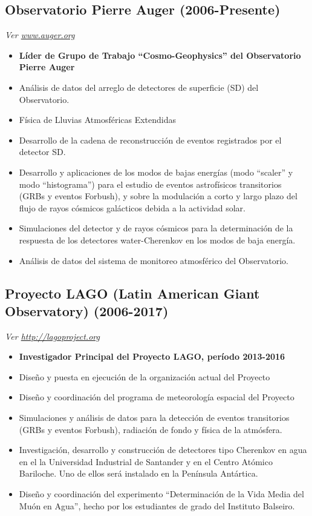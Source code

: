\subsection*{Observatorio Pierre Auger (2006-Presente)}

{\small{\textit{Ver \href{http://www.auger.org/}{www.auger.org}}}}
\begin{itemize}
\item {\bf{Líder de Grupo de Trabajo ``Cosmo-Geophysics'' del Observatorio Pierre Auger}}
\item Análisis de datos del arreglo de detectores de superficie (SD) del Observatorio.
\item Física de Lluvias Atmosféricas Extendidas
\item Desarrollo de la cadena de reconstrucción de eventos registrados por el detector SD.
\item Desarrollo y aplicaciones de los modos de bajas energías (modo ``scaler'' y modo ``histograma'') para el estudio de eventos astrofísicos transitorios (GRBs y eventos Forbush), y sobre la modulación a corto y largo plazo del flujo de rayos cósmicos galácticos debida a la actividad solar.
\item Simulaciones del detector y de rayos cósmicos para la determinación de la respuesta de los detectores water-Cherenkov en los modos de baja energía.
\item Análisis de datos del sistema de monitoreo atmosférico del Observatorio.
\end{itemize}

\subsection*{Proyecto LAGO (Latin American Giant Observatory) (2006-2017)}
{\small{\textit{Ver \href{http://lagoproject.org}{http://lagoproject.org}}}}
\begin{itemize}
\item {\bf{Investigador Principal del Proyecto LAGO, período 2013-2016}}
\item Diseño y puesta en ejecución de la organización actual del Proyecto
\item Diseño y coordinación del programa de meteorología espacial del Proyecto
\item Simulaciones y análisis de datos para la detección de eventos transitorios (GRBs y eventos Forbush), radiación de fondo y física de la atmósfera.
\item Investigación, desarrollo y construcción de detectores tipo Cherenkov en agua en el la Universidad Industrial de Santander y en el Centro Atómico Bariloche. Uno de ellos será instalado en la Península Antártica. 
\item Diseño y coordinación del experimento ``Determinación de la Vida Media del Muón en Agua'', hecho por los estudiantes de grado del Instituto Balseiro.
\end{itemize}

